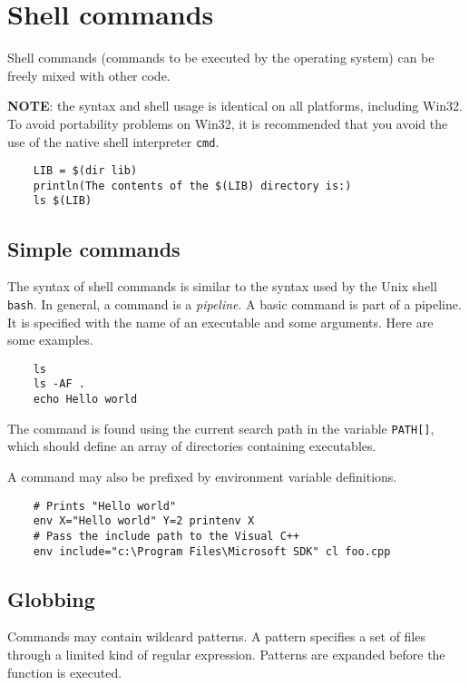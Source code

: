 %
\chapter{Shell commands}
\label{chapter:shell}

Shell commands (commands to be executed by the operating system) can be freely mixed with other
code.

\textbf{NOTE}: the syntax and shell usage is identical on all platforms, including Win32.  To avoid
portability problems on Win32, it is recommended that you avoid the use of the native shell
interpreter \verb+cmd+.

\begin{verbatim}
    LIB = $(dir lib)
    println(The contents of the $(LIB) directory is:)
    ls $(LIB)
\end{verbatim}

\section{Simple commands}

The syntax of shell commands is similar to the syntax used by the Unix shell \verb+bash+.  In
general, a command is a \emph{pipeline}.  A basic command is part of a pipeline.  It is specified
with the name of an executable and some arguments.  Here are some examples.

\begin{verbatim}
    ls
    ls -AF .
    echo Hello world
\end{verbatim}

The command is found using the current search path in the variable \verb+PATH[]+, which should
define an array of directories containing executables.

A command may also be prefixed by environment variable definitions.

\begin{verbatim}
    # Prints "Hello world"
    env X="Hello world" Y=2 printenv X
    # Pass the include path to the Visual C++
    env include="c:\Program Files\Microsoft SDK" cl foo.cpp
\end{verbatim}

\section{Globbing}

Commands may contain wildcard patterns.  A pattern specifies a set of files through a limited kind
of regular expression.  Patterns are expanded before the function is executed.


